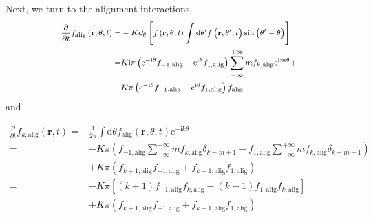 \documentclass[a4paper, amsfonts, amssymb, amsmath, reprint, showkeys, showpacs, nofootinbib, twoside]{revtex4-2}
\begin{document}
Next, we turn to the alignment interactions,
\begin{equation}
    \footnotesize
    \begin{aligned}
        \frac{\partial}{\partial t}f_{\mathrm{alig}}\left( \mathbf{r},\theta ,t \right) =&-K\partial _{\theta}\left[f\left( \mathbf{r},\theta ,t \right) \int{\mathrm{d}\theta ^{\prime}f\left( \mathbf{r},\theta ^{\prime},t \right) \sin \left( \theta ^{\prime}-\theta \right)}\right]\\
        =&K\mathrm{i}\pi \left( \mathrm{e}^{-\mathrm{i}\theta}f_{-1,\mathrm{alig}}-\mathrm{e}^{\mathrm{i}\theta}f_{1,\mathrm{alig}} \right) \sum_{-\infty}^{+\infty}{mf_{k,\mathrm{alig}}\mathrm{e}^{\mathrm{i}m\theta}}+\\
        &K\pi \left( \mathrm{e}^{-\mathrm{i}\theta}f_{-1,\mathrm{alig}}+\mathrm{e}^{\mathrm{i}\theta}f_{1,\mathrm{alig}} \right) f_{\mathrm{alig}}\\
    \end{aligned}
\end{equation}
and
\begin{widetext}
\begin{equation}
    \begin{aligned}
        \frac{\partial}{\partial t}f_{k,\mathrm{alig}}\left( \mathbf{r},t \right) =&\frac{1}{2\pi}\int{\mathrm{d}\theta f_{\mathrm{alig}}\left( \mathbf{r},\theta ,t \right) \mathrm{e}^{-\mathrm{i}k\theta}}\\
        =&-K\pi \left( f_{-1,\mathrm{alig}}\sum_{-\infty}^{+\infty}{mf_{k,\mathrm{alig}}\delta _{k-m+1}}-f_{1,\mathrm{alig}}\sum_{-\infty}^{+\infty}{mf_{k,\mathrm{alig}}\delta _{k-m-1}} \right)\\
        &+K\pi \left( f_{k+1,\mathrm{alig}}f_{-1,\mathrm{alig}}+f_{k-1,\mathrm{alig}}f_{1,\mathrm{alig}} \right)\\
        =&-K\pi \left[ \left( k+1 \right) f_{-1,\mathrm{alig}}f_{k,\mathrm{alig}}-\left( k-1 \right) f_{1,\mathrm{alig}}f_{k,\mathrm{alig}} \right]\\
        &+K\pi \left( f_{k+1,\mathrm{alig}}f_{-1,\mathrm{alig}}+f_{k-1,\mathrm{alig}}f_{1,\mathrm{alig}} \right)\\
    \end{aligned}
\end{equation}
\end{widetext}
\end{document}
